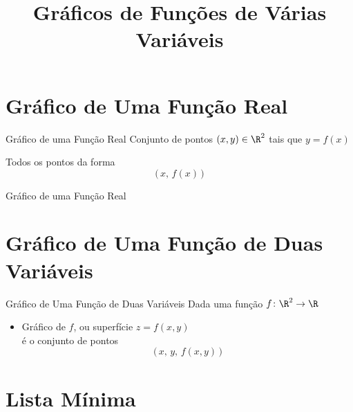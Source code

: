 \documentclass[fleqn,utf8,aspectratio=169,12pt]{beamer}
\title{Gráficos de Funções de Várias Variáveis}
\begin{document}
\addtitle

\section{Gráfico de Uma Função Real}

\begin{frame}{Gráfico de uma Função Real}
  Conjunto de pontos $(x, y) \in \R^2$ tais que \(y = f(x)\)

  \pause
  \vspace{\baselineskip}
  Todos os pontos da forma
  \[
    \big( \, x, \, f(x) \, \big)
  \]
\end{frame}

\begin{frame}{Gráfico de uma Função Real}
  \centering
  
\end{frame}

\section{Gráfico de Uma Função de Duas Variáveis}

\begin{frame}{Gráfico de Uma Função de Duas Variáveis}
  Dada uma função \(f\colon\R^2\to\R\)
  \begin{itemize}[<+->]
    \item Gráfico de $f$, ou superfície \(z=f(x, y)\) \\
    é o conjunto de pontos
    \[
      \big( \, x, \, y, \, f(x, y) \, \big)
    \]
  \end{itemize}
\end{frame}



\section{Lista Mínima}
\end{document}
